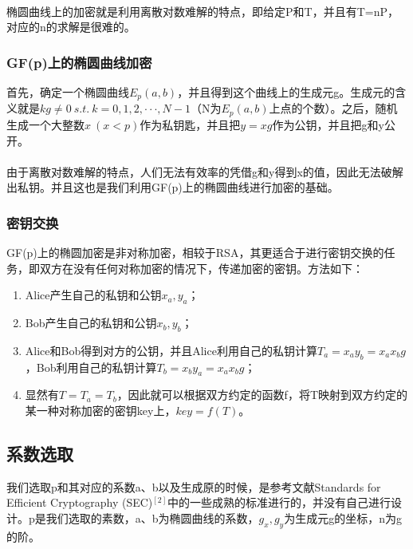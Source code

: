 \paragraph{}椭圆曲线上的加密就是利用离散对数难解的特点，即给定P和T，并且有T=nP，对应的n的求解是很难的。

\subsubsection{GF(p)上的椭圆曲线加密}

首先，确定一个椭圆曲线$E_p(a,b)$，并且得到这个曲线上的生成元g。生成元的含义就是$kg\not=0\ s.t.\ k=0,1,2,\cdot\cdot\cdot, N-1$（N为$E_p(a,b)$上点的个数）。之后，随机生成一个大整数$x\ (x<p)$作为私钥匙，并且把$y=xg$作为公钥，并且把g和y公开。
\paragraph{}由于离散对数难解的特点，人们无法有效率的凭借g和y得到x的值，因此无法破解出私钥。并且这也是我们利用GF(p)上的椭圆曲线进行加密的基础。

\subsubsection{密钥交换}

GF(p)上的椭圆加密是非对称加密，相较于RSA，其更适合于进行密钥交换的任务，即双方在没有任何对称加密的情况下，传递加密的密钥。方法如下：

\begin{enumerate}
    \item Alice产生自己的私钥和公钥$x_a,y_a$；
    \item Bob产生自己的私钥和公钥$x_b,y_b$；
    \item Alice和Bob得到对方的公钥，并且Alice利用自己的私钥计算$T_a=x_ay_b=x_ax_bg$，Bob利用自己的私钥计算$T_b=x_by_a=x_ax_bg$；
    \item 显然有$T=T_a=T_b$，因此就可以根据双方约定的函数f，将T映射到双方约定的某一种对称加密的密钥key上，$key=f(T)$。
\end{enumerate}

\subsection{系数选取}

我们选取p和其对应的系数a、b以及生成原的时候，是参考文献Standards for Efficient Cryptography (SEC)$^[2]$中的一些成熟的标准进行的，并没有自己进行设计。p是我们选取的素数，a、b为椭圆曲线的系数，$g_x,g_y$为生成元g的坐标，n为g的阶。

